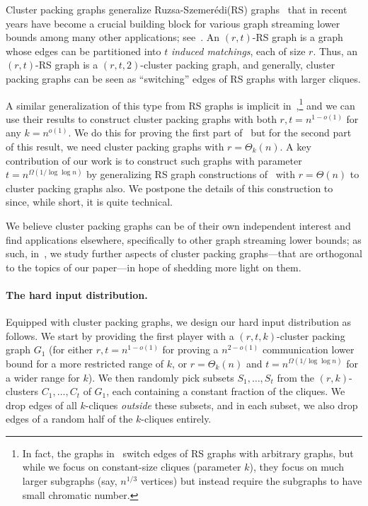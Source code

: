 \documentclass[11pt]{article}
\theoremstyle{definition}
\newcommand{\rs}{{{Ruzsa-Szemerédi}}\xspace}
\begin{document}
Cluster packing graphs generalize \rs (RS) graphs~\cite{RuzsaS78} that in recent years have become a crucial building block for various graph streaming lower bounds among many other applications; see~. 
An $(r,t)$-RS graph is a graph whose edges can be partitioned into $t$ \emph{induced matchings}, each of size $r$. 
Thus, an $(r,t)$-RS graph is a $(r,t,2)$-cluster packing graph, and generally, cluster packing graphs can be seen as ``switching'' edges of RS graphs with larger cliques. 

A  similar generalization of this type from RS graphs is implicit in~\cite{AssadiKNS24},\footnote{In fact, the graphs in~\cite{AssadiKNS24} switch edges of RS graphs with arbitrary graphs, but while we focus on constant-size cliques (parameter $k$), 
they focus on much larger subgraphs (say, $n^{1/3}$ vertices) but instead require the subgraphs to have small chromatic number.} and we can use their results to construct cluster packing graphs with both $r , t = n^{1-o(1)}$ for any $k=n^{o(1)}$. We do this for proving the first part of~ but for the second part of this result, we need cluster packing graphs with $r=\Theta_k(n)$. A key contribution of our work is to construct such graphs with parameter $t=n^{\Omega(1/\log\log{n})}$ 
by generalizing RS graph constructions of~\cite{FischerLNRRS02} with $r=\Theta(n)$ to cluster packing graphs also. We postpone the details of this construction to~ since, while short, it is quite technical. 

We believe cluster packing graphs can be of their own independent interest and find applications elsewhere, specifically to other graph streaming lower bounds; as such, in~, 
we study further aspects of cluster packing graphs---that are orthogonal to the topics of our paper---in hope of shedding more light on them. 

\paragraph{The hard input distribution.} Equipped with cluster packing graphs, we design our hard input distribution as follows. 
We start by providing the first player with a $(r,t,k)$-cluster packing graph $G_1$ (for either $r,t = n^{1-o(1)}$ for proving a $n^{2-o(1)}$ communication lower bound for a more restricted range of $k$, 
or $r=\Theta_k(n)$ and $t = n^{\Omega(1/\log\log{n})}$ for a wider range for $k$). We then randomly pick subsets $S_1,\ldots,S_t$ from the $(r,k)$-clusters $C_1,\ldots,C_t$ of $G_1$, each containing a constant fraction of the cliques.  
We drop edges of all $k$-cliques \emph{outside} these subsets, and in each subset, we also drop edges of a random half of the $k$-cliques entirely. 
\end{document}
